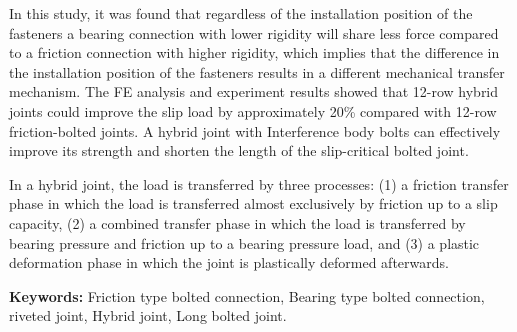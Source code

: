 
In this study, it was found that regardless of the installation position of the fasteners a bearing connection with lower rigidity will share less force compared to a friction connection with higher rigidity, which implies that the difference in the installation position of the fasteners results in a different mechanical transfer mechanism. The FE analysis and experiment results showed that 12-row hybrid joints could improve the slip load by approximately 20\% compared with 12-row friction-bolted joints. A hybrid joint with Interference body bolts can effectively improve its strength and shorten the length of the slip-critical bolted joint.

In a hybrid joint, the load is transferred by three processes: (1) a friction transfer phase in which the load is transferred almost exclusively by friction up to a slip capacity, (2) a combined transfer phase in which the load is transferred by bearing pressure and friction up to a bearing pressure load, and (3) a plastic deformation phase in which the joint is plastically deformed afterwards. 



\textbf{Keywords:} Friction type bolted connection, Bearing type bolted connection, riveted joint, Hybrid joint, Long bolted joint.